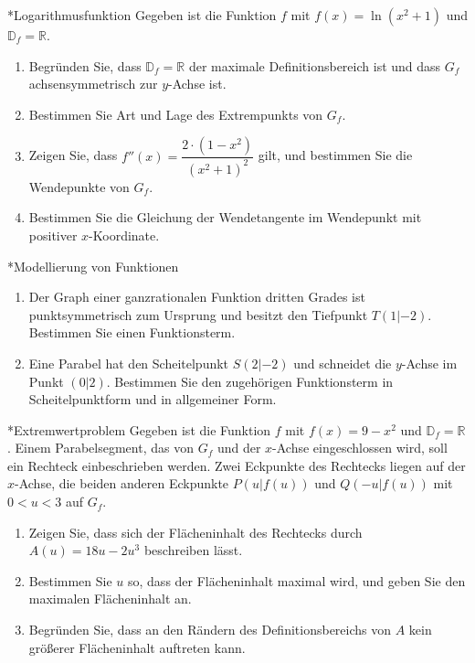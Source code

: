 \begin{uebung}*{Logarithmusfunktion}
Gegeben ist die Funktion $f$ mit $f(x) = \ln{(x^2+1)}$ und $\mathds{D}_f = \mathds{R}$.
\begin{enumerate}[label=\alph*)]
  \item Begründen Sie, dass $\mathds{D}_f = \mathds{R}$ der maximale Definitionsbereich ist und dass $G_f$ achsensymmetrisch zur $y$-Achse ist.
  \item Bestimmen Sie Art und Lage des Extrempunkts von $G_f$.
  \item Zeigen Sie, dass $f''(x) = \dfrac{2\cdot(1-x^2)}{(x^2+1)^2}$ gilt, und bestimmen Sie die Wendepunkte von $G_f$.
  \item Bestimmen Sie die Gleichung der Wendetangente im Wendepunkt mit positiver $x$-Koordinate.
\end{enumerate}
\end{uebung}


\begin{uebung}*{Modellierung von Funktionen}
\begin{enumerate}[label=\alph*)]
  \item Der Graph einer ganzrationalen Funktion dritten Grades ist punktsymmetrisch zum Ursprung und besitzt den Tiefpunkt $T(1|-2)$. Bestimmen Sie einen Funktionsterm.
  \item Eine Parabel hat den Scheitelpunkt $S(2|-2)$ und schneidet die $y$-Achse im Punkt $(0|2)$. Bestimmen Sie den zugehörigen Funktionsterm in Scheitelpunktform und in allgemeiner Form.
\end{enumerate}
\end{uebung}

\begin{uebung}*{Extremwertproblem}
Gegeben ist die Funktion $f$ mit $f(x) = 9-x^2$ und $\mathds{D}_f=\mathds{R}$. Einem Parabelsegment, das von $G_f$ und der $x$-Achse eingeschlossen wird, soll ein Rechteck einbeschrieben werden. Zwei Eckpunkte des Rechtecks liegen auf der $x$-Achse, die beiden anderen Eckpunkte $P(u|f(u))$ und $Q(-u|f(u))$ mit $0<u<3$ auf $G_f$.
\begin{enumerate}[label=\alph*)]
  \item Zeigen Sie, dass sich der Flächeninhalt des Rechtecks durch $A(u) = 18u-2u^3$ beschreiben lässt.
  \item Bestimmen Sie $u$ so, dass der Flächeninhalt maximal wird, und geben Sie den maximalen Flächeninhalt an.
  \item Begründen Sie, dass an den Rändern des Definitionsbereichs von $A$ kein größerer Flächeninhalt auftreten kann.
\end{enumerate}
\end{uebung}

